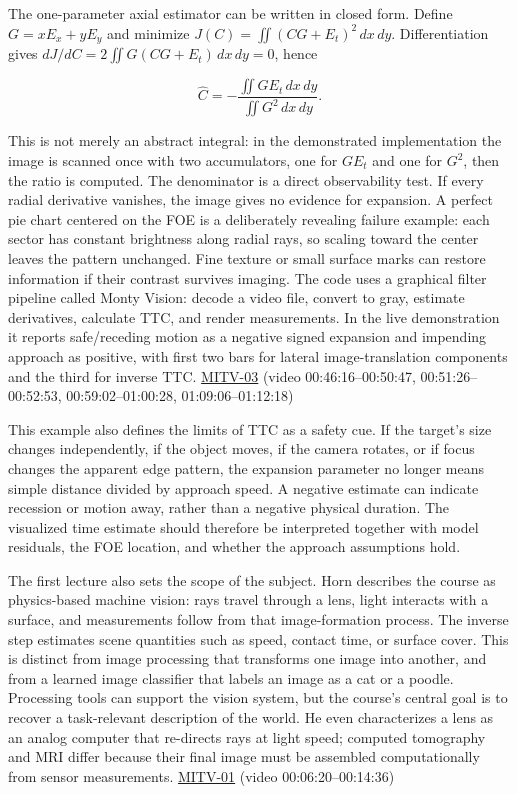 The one-parameter axial estimator can be written in closed form. Define \(G=xE_x+yE_y\) and minimize \(J(C)=\iint (CG+E_t)^2\,dx\,dy\). Differentiation gives \(dJ/dC=2\iint G(CG+E_t)\,dx\,dy=0\), hence

\[
\widehat C=-\frac{\iint GE_t\,dx\,dy}{\iint G^2\,dx\,dy}.
\]

This is not merely an abstract integral: in the demonstrated implementation the image is scanned once with two accumulators, one for \(GE_t\) and one for \(G^2\), then the ratio is computed. The denominator is a direct observability test. If every radial derivative vanishes, the image gives no evidence for expansion. A perfect pie chart centered on the FOE is a deliberately revealing failure example: each sector has constant brightness along radial rays, so scaling toward the center leaves the pattern unchanged. Fine texture or small surface marks can restore information if their contrast survives imaging. The code uses a graphical filter pipeline called Monty Vision: decode a video file, convert to gray, estimate derivatives, calculate TTC, and render measurements. In the live demonstration it reports safe/receding motion as a negative signed expansion and impending approach as positive, with first two bars for lateral image-translation components and the third for inverse TTC. \hyperref[04-visual-computing-ii-ch036-mitv-03---time-to-contact-focus-of-expansion-direct-motion-vision-methods-noise-gain]{MITV-03} (video 00:46:16--00:50:47, 00:51:26--00:52:53, 00:59:02--01:00:28, 01:09:06--01:12:18)

This example also defines the limits of TTC as a safety cue. If the target's size changes independently, if the object moves, if the camera rotates, or if focus changes the apparent edge pattern, the expansion parameter no longer means simple distance divided by approach speed. A negative estimate can indicate recession or motion away, rather than a negative physical duration. The visualized time estimate should therefore be interpreted together with model residuals, the FOE location, and whether the approach assumptions hold.

The first lecture also sets the scope of the subject. Horn describes the course as physics-based machine vision: rays travel through a lens, light interacts with a surface, and measurements follow from that image-formation process. The inverse step estimates scene quantities such as speed, contact time, or surface cover. This is distinct from image processing that transforms one image into another, and from a learned image classifier that labels an image as a cat or a poodle. Processing tools can support the vision system, but the course's central goal is to recover a task-relevant description of the world. He even characterizes a lens as an analog computer that re-directs rays at light speed; computed tomography and MRI differ because their final image must be assembled computationally from sensor measurements. \hyperref[04-visual-computing-ii-ch036-mitv-01---introduction-to-machine-vision]{MITV-01} (video 00:06:20--00:14:36)

